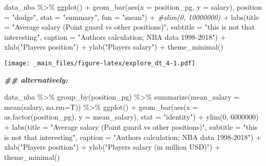 \documentclass[
]{book}
\newenvironment{Shaded}{\begin{snugshade}}{\end{snugshade}}
\newcommand{\AttributeTok}[1]{\textcolor[rgb]{0.77,0.63,0.00}{#1}}
\newcommand{\CommentTok}[1]{\textcolor[rgb]{0.56,0.35,0.01}{\textit{#1}}}
\newcommand{\DecValTok}[1]{\textcolor[rgb]{0.00,0.00,0.81}{#1}}
\newcommand{\DocumentationTok}[1]{\textcolor[rgb]{0.56,0.35,0.01}{\textbf{\textit{#1}}}}
\newcommand{\FunctionTok}[1]{\textcolor[rgb]{0.00,0.00,0.00}{#1}}
\newcommand{\NormalTok}[1]{#1}
\newcommand{\SpecialCharTok}[1]{\textcolor[rgb]{0.00,0.00,0.00}{#1}}
\newcommand{\StringTok}[1]{\textcolor[rgb]{0.31,0.60,0.02}{#1}}
\begin{document}
\begin{Shaded}
\begin{Highlighting}[]
\NormalTok{data\_nba }\SpecialCharTok{\%\textgreater{}\%} 
  \FunctionTok{ggplot}\NormalTok{() }\SpecialCharTok{+}
  \FunctionTok{geom\_bar}\NormalTok{(}\FunctionTok{aes}\NormalTok{(}\AttributeTok{x =}\NormalTok{ position\_pg, }
               \AttributeTok{y =}\NormalTok{ salary),}
           \AttributeTok{position =} \StringTok{"dodge"}\NormalTok{,}
           \AttributeTok{stat =} \StringTok{"summary"}\NormalTok{,}
           \AttributeTok{fun =} \StringTok{"mean"}\NormalTok{) }\SpecialCharTok{+} 
  \CommentTok{\#xlim(0, 10000000) +}
  \FunctionTok{labs}\NormalTok{(}\AttributeTok{title =} \StringTok{"Average salary (Point guard vs other positions)"}\NormalTok{,}
       \AttributeTok{subtitle =} \StringTok{"this is not that interesting"}\NormalTok{,}
       \AttributeTok{caption =} \StringTok{"Authors\textquotesingle{} calculation; NBA data 1998{-}2018"}\NormalTok{) }\SpecialCharTok{+}
  \FunctionTok{xlab}\NormalTok{(}\StringTok{"Player\textquotesingle{}s position"}\NormalTok{) }\SpecialCharTok{+}
  \FunctionTok{ylab}\NormalTok{(}\StringTok{"Player\textquotesingle{}s salary"}\NormalTok{) }\SpecialCharTok{+}
  \FunctionTok{theme\_minimal}\NormalTok{()}
\end{Highlighting}
\end{Shaded}

\texttt{[image: \_main\_files/figure-latex/explore\_dt\_4-1.pdf]}

\begin{Shaded}
\begin{Highlighting}[]
\DocumentationTok{\#\# alternatively:}

\NormalTok{data\_nba }\SpecialCharTok{\%\textgreater{}\%} 
  \FunctionTok{group\_by}\NormalTok{(position\_pg) }\SpecialCharTok{\%\textgreater{}\%}
  \FunctionTok{summarize}\NormalTok{(}\AttributeTok{mean\_salary =} \FunctionTok{mean}\NormalTok{(salary, }\AttributeTok{na.rm=}\NormalTok{T)) }\SpecialCharTok{\%\textgreater{}\%}
  \FunctionTok{ggplot}\NormalTok{() }\SpecialCharTok{+}
  \FunctionTok{geom\_bar}\NormalTok{(}\FunctionTok{aes}\NormalTok{(}\AttributeTok{x =} \FunctionTok{as.factor}\NormalTok{(position\_pg), }
               \AttributeTok{y =}\NormalTok{ mean\_salary),}
           \AttributeTok{stat =} \StringTok{"identity"}\NormalTok{) }\SpecialCharTok{+} 
  \FunctionTok{ylim}\NormalTok{(}\DecValTok{0}\NormalTok{, }\DecValTok{6000000}\NormalTok{) }\SpecialCharTok{+}
  \FunctionTok{labs}\NormalTok{(}\AttributeTok{title =} \StringTok{"Average salary (Point guard vs other positions)"}\NormalTok{,}
       \AttributeTok{subtitle =} \StringTok{"this is not that interesting"}\NormalTok{,}
       \AttributeTok{caption =} \StringTok{"Authors\textquotesingle{} calculation; NBA data 1998{-}2018"}\NormalTok{) }\SpecialCharTok{+}
  \FunctionTok{xlab}\NormalTok{(}\StringTok{"Player\textquotesingle{}s position"}\NormalTok{) }\SpecialCharTok{+}
  \FunctionTok{ylab}\NormalTok{(}\StringTok{"Player\textquotesingle{}s salary (in million USD)"}\NormalTok{) }\SpecialCharTok{+}
  \FunctionTok{theme\_minimal}\NormalTok{()}
\end{Highlighting}
\end{Shaded}
\end{document}
